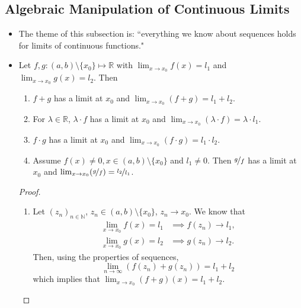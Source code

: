 \documentclass{article}
\newcommand{\R}{\mathbb{R}}
\newcommand{\N}{\mathbb{N}}
\newcommand{\seq}[2]{(#1_{#2})_{#2 \in \N}}
\newcommand{\?}{\stackrel{?}{=}}
\theoremstyle{definition} %
\begin{document}
\subsection{Algebraic Manipulation of Continuous Limits}

\begin{itemize}
    \item The theme of this subsection is: ``everything we know about sequences holds for limits of continuous functions."
    \item[]
          \begin{lemma}
              Let $f, g: (a, b) \setminus\{x_0\} \mapsto \R$ with $\lim_{x \to x_0} f(x) = l_1$ and $\lim_{x \to x_0} g(x) = l_2$. Then
              \begin{enumerate}[label=(\arabic*)]
                  \item $f + g$ has a limit at $x_0$ and $\lim_{x \to x_0} (f + g) = l_1 + l_2$.
                  \item For $\lambda \in \R$, $\lambda \cdot f$ has a limit at $x_0$ and $\lim_{x \to x_0} (\lambda \cdot f) = \lambda \cdot l_1$.
                  \item $f \cdot g$ has a limit at $x_0$ and $\lim_{x \to x_0} (f \cdot g) = l_1 \cdot l_2$.
                  \item Assume $f(x) \neq 0, x \in (a, b) \setminus\{x_0\}$ and $l_1 \neq 0$. Then $\nicefrac{g}{f}$ has a limit at $x_0$ and $\lim_{x \to x_0} (\nicefrac{g}{f}) = \nicefrac{l_2}{l_1}$.
              \end{enumerate}
          \end{lemma}
          \begin{proof}
              \begin{enumerate}[label=(\arabic*)]
                  \item Let $\seq{z}{n}$, $z_n \in (a, b) \setminus\{x_0\}$, $z_n \rightarrow x_0$. We know that
                        \begin{align*}
                            \lim_{x \to x_0} f(x) = l_1 & \implies f(z_n) \rightarrow l_1, \\
                            \lim_{x \to x_0} g(x) = l_2 & \implies g(z_n) \rightarrow l_2.
                        \end{align*}
                        Then, using the properties of sequences,
                        $$\lim_{n \to \infty} (f(z_n) + g(z_n)) = l_1 + l_2$$
                        which implies that $\lim_{x \to x_0} (f + g)(x) = l_1 + l_2$.
              \end{enumerate}
          \end{proof}
\end{itemize}
\end{document}
